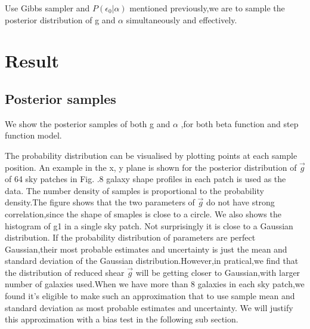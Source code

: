 \documentclass[useAMS,usenatbib]{mn2e}
\begin{document}
Use Gibbs sampler and $P(\epsilon_{0}|\alpha)$ mentioned previously,we
are to sample the posterior distribution of g and $\alpha$ simultaneously
and effectively.




\section{Result}

\label{sec:XXX}


\subsection{Posterior samples}

We show the posterior samples of both g and $\alpha$ ,for both beta
function and step function model. 

The probability distribution can be visualised by plotting points at each sample
position. An example in the x, y plane is shown for the posterior distribution of
$\vec{g}$ of 64 sky patches in Fig. .8 galaxy shape profiles in each patch is used as the data.
The number density of samples is proportional to the probability density.The figure shows that the two parameters of $\vec{g}$
do not have strong correlation,since the shape of smaples is close to a circle.
We also shows the histogram of g1 in a single sky patch. Not surprisingly it is close to a Gaussian distribution.
If the probability distribution of parameters are perfect Gaussian,their most probable estimates and uncertainty 
is just the mean and standard deviation of the Gaussian distribution.However,in pratical,we find that the distribution 
of reduced shear $\vec{g}$ will be getting closer to Gaussian,with larger number of galaxies used.When we have more than
8 galaxies in each sky patch,we found it's eligible to make such an approximation that to use sample mean and standard 
deviation as most probable estimates and uncertainty. We will justify this approximation with a bias test in the following
sub section.
\end{document}
